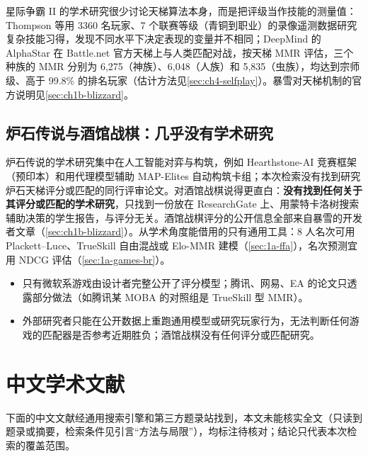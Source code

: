 星际争霸 II 的学术研究很少讨论天梯算法本身，而是把评级当作技能的测量值：Thompson 等用 3360 名玩家、7 个联赛等级（青铜到职业）的录像遥测数据研究复杂技能习得，发现不同水平下决定表现的变量并不相同\cite{thompson2013video}\tagLit；DeepMind 的 AlphaStar 在 Battle.net 官方天梯上与人类匹配对战，按天梯 MMR 评估，三个种族的 MMR 分别为 6,275（神族）、6,048（人族）和 5,835（虫族），均达到宗师级、高于 99.8\% 的排名玩家\cite{vinyals2019grandmaster}\tagLit（估计方法见\cref{sec:ch4-selfplay}）。暴雪对天梯机制的官方说明见\cref{sec:ch1b-blizzard}。

\subsection{炉石传说与酒馆战棋：几乎没有学术研究}\label{sec:1a-games-hs}

炉石传说的学术研究集中在人工智能对弈与构筑，例如 Hearthstone-AI 竞赛框架（预印本）\cite{dockhorn2019introducing}\tagLit{}和用代理模型辅助 MAP-Elites 自动构筑卡组\cite{zhang2022deep}\tagLit；本次检索没有找到研究炉石天梯评分或匹配的同行评审论文。对酒馆战棋说得更直白：\textbf{没有找到任何关于其评分或匹配的学术研究}，只找到一份放在 ResearchGate 上、用蒙特卡洛树搜索辅助决策的学生报告，与评分无关。酒馆战棋评分的公开信息全部来自暴雪的开发者文章（\cref{sec:ch1b-blizzard}）。从学术角度能借用的只有通用工具：8 人名次可用 Plackett–Luce、TrueSkill 自由混战或 Elo-MMR 建模（\cref{sec:1a-ffa}），名次预测宜用 NDCG 评估（\cref{sec:1a-games-br}）。


\begin{keybox}
\begin{itemize}
  \item 只有微软系游戏由设计者完整公开了评分模型；腾讯、网易、EA 的论文只透露部分做法（如腾讯某 MOBA 的对照组是 TrueSkill 型 MMR）。
  \item 外部研究者只能在公开数据上重跑通用模型或研究玩家行为，无法判断任何游戏的匹配器是否参考近期胜负；酒馆战棋没有任何评分或匹配研究。
\end{itemize}
\end{keybox}

\section{中文学术文献}\label{sec:1a-cn}

下面的中文文献经通用搜索引擎和第三方题录站找到，本文未能核实全文（只读到题录或摘要，检索条件见引言“方法与局限”），均标注待核对；结论只代表本次检索的覆盖范围。

